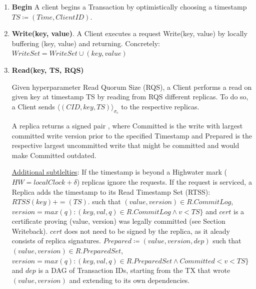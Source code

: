 \begin{enumerate}
\item \textbf{Begin} A client begins a Transaction by optimistically choosing a timestamp $TS \coloneqq (Time, Client ID)$. 
\item \textbf{Write(key, value)}. A Client executes a request Write(key, value) by locally buffering (key, value) and returning. Concretely: $WriteSet = WriteSet \cup (key, value)$


\item \textbf{Read(key, TS, RQS)} 

Given hyperparameter Read Quorum Size (RQS), a Client performs a read on given key at timestamp TS by reading from RQS different replicas. To do so, a Client sends $\langle(CID, key, TS)\rangle_{\sigma_c}$  to the respective replicas.\\


A replica returns a signed pair , where Committed is the write with largest committed write version prior to the specified Timestamp and Prepared is the respective largest uncommitted write that might be committed and would make Committed outdated. 

\underline{Additional subtlelties}: If the timestamp is beyond a Highwater mark ($HW = localClock + \delta$) replicas ignore the requests. If the request is serviced, a Replica adds the timestamp to its Read Timestamp Set (RTSS): $RTSS(key) += (TS)$.  such that $ (value, version) \in R.CommitLog$, $version = max(q) : (key, val, q) \in R.CommitLog \land v < TS \}$ and $cert$ is a certificate proving (value, version) was legally committed (see Section Writeback). $cert$ does not need to be signed by the replica, as it aleady consists of replica signatures.
 $Prepared \coloneqq (value, version, dep)$ such that $(value, version) \in R.PreparedSet$, $version = max(q) : (key, val, q) \in R.PreparedSet \land Committed < v < TS \}$ and $dep$ is a DAG of Transaction IDs, starting from the TX that wrote $(value, version)$ and extending to its own dependencies.


\end{enumerate}
